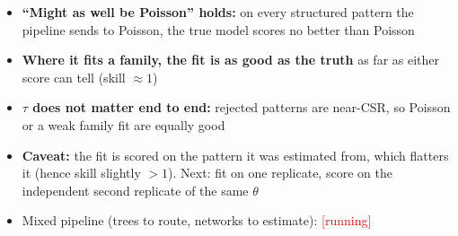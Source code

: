 \documentclass[11pt]{article}
\newcommand{\pending}[1]{\textcolor{red}{[#1]}}
\begin{document}
\begin{itemize}
  \item \textbf{``Might as well be Poisson'' holds:} on every structured pattern the pipeline sends to Poisson, the true model scores no better than Poisson
  \item \textbf{Where it fits a family, the fit is as good as the truth} as far as either score can tell (skill $\approx1$)
  \item \textbf{$\tau$ does not matter end to end:} rejected patterns are near-CSR, so Poisson or a weak family fit are equally good
  \item \textbf{Caveat:} the fit is scored on the pattern it was estimated from, which flatters it (hence skill slightly $>1$). Next: fit on one replicate, score on the independent second replicate of the same $\theta$
  \item Mixed pipeline (trees to route, networks to estimate): \pending{running}
\end{itemize}
\end{document}

